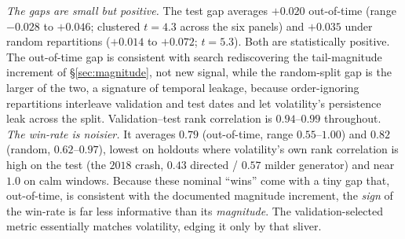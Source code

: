 \documentclass[sigconf,nonacm]{acmart}
\begin{document}
\emph{The gaps are small but positive.} The test gap averages $+0.020$ out-of-time (range
$-0.028$ to $+0.046$; clustered $t=4.3$ across the six panels) and $+0.035$ under random
repartitions ($+0.014$ to $+0.072$; $t=5.3$). Both are statistically positive. The
out-of-time gap is consistent with search rediscovering the tail-magnitude increment of
\S\ref{sec:magnitude}, not new signal, while the random-split gap is the larger of the two,
a signature of temporal leakage, because order-ignoring repartitions interleave validation
and test dates and let volatility's persistence leak across the split. Validation--test
rank correlation is $0.94$--$0.99$ throughout.
\emph{The win-rate is noisier.} It averages $0.79$ (out-of-time, range $0.55$--$1.00$) and
$0.82$ (random, $0.62$--$0.97$), lowest on holdouts where volatility's own rank correlation is high
on the test (the $2018$ crash, $0.43$ directed / $0.57$ milder generator) and near $1.0$
on calm windows. Because these nominal ``wins'' come with a tiny gap that, out-of-time, is
consistent with the documented magnitude increment, the \emph{sign} of the win-rate is far
less informative than its \emph{magnitude}. The validation-selected metric essentially
matches volatility, edging it only by that sliver.
\end{document}
